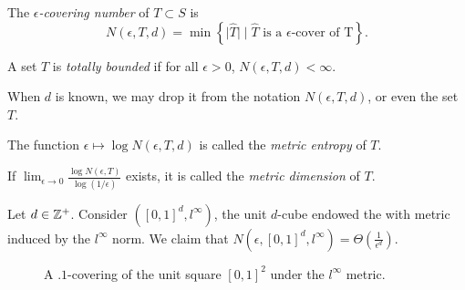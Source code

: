 \documentclass[11pt]{article}
\begin{document}
\begin{definition}
  The \emph{$\epsilon$-covering number} of $T\subset S$ is
  \begin{equation*}
    N(\epsilon, T, d) = \min\left\{
    \big|\widehat{T}\big| \mid \widehat{T}\text{ is a }\epsilon\text{-cover of T}
    \right\}.
  \end{equation*}
\end{definition}

\begin{definition}
  A set $T$ is \emph{totally bounded} if for all $\epsilon > 0$, $N(\epsilon, T, d) < \infty$. 
\end{definition}
When $d$ is known, we may drop it from the notation $N(\epsilon, T, d)$, or even the set $T$.
\begin{definition}
  The function $\epsilon \mapsto \log{N(\epsilon, T, d)}$ is called the \emph{metric entropy} of $T$.
\end{definition}
\begin{definition}
  If $\lim_{\epsilon \to 0} \frac{\log{N(\epsilon, T)}}{\log(1/\epsilon)}$ exists, it is called the
  \emph{metric dimension} of $T$.
\end{definition}

\begin{example}
  Let $d \in \mathbb{Z}^+$.
  Consider $([0,1]^d, l^\infty)$, the unit $d$-cube endowed the with metric
  induced by the $l^\infty$ norm. We claim that $N(\epsilon, [0,1]^d, l^\infty)
  = \Theta\left(\frac{1}{\epsilon^d}\right)$.
\end{example}

\begin{figure}[ht]
  \centering
\caption{A $.1$-covering of the unit square $[0,1]^2$ under the $l^\infty$ metric.}
  \label{fig:2}
\end{figure}
\end{document}

